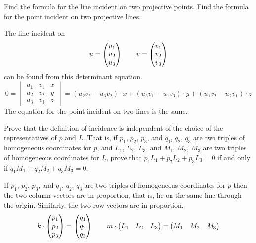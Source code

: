 \begin{exercises}
  \item
    Find the formula for the line incident on two projective points.
    Find the formula for the point incident on two projective lines.
    \begin{answer}
      The line incident on 
      \begin{equation*}
        u=\begin{pmatrix} u_1 \\ u_2 \\ u_3 \end{pmatrix}
        \qquad
        v=\begin{pmatrix} v_1 \\ v_2 \\ v_3 \end{pmatrix}
      \end{equation*}
      can be found from this determinant equation.
      \begin{equation*}
        0=\begin{vmatrix}
          u_1  &v_1  &x  \\
          u_2  &v_2  &y  \\
          u_3  &v_3  &z
        \end{vmatrix}
        =(u_2v_3-u_3v_2)\cdot x 
          + (u_3v_1-u_1v_3)\cdot y 
          + (u_1v_2-u_2v_1)\cdot z
      \end{equation*}
      The equation for the point incident on two lines is the same. 
    \end{answer}
  \item \label{exer:IncidentIndReps}
    Prove that the definition of incidence is independent of the choice of 
    the representatives of $p$ and $L$.
    That is, if $p_1$, $p_2$, $p_3$, and $q_1$, $q_2$, $q_3$ are two triples of
    homogeneous coordinates for $p$, and 
    $L_1$, $L_2$, $L_3$, and $M_1$, $M_2$, $M_3$ are two triples of 
    homogeneous coordinates for $L$, prove that  
    $p_1L_1+p_2L_2+p_3L_3=0$ if and only if 
    $q_1M_1+q_2M_2+q_3M_3=0$. 
    \begin{answer}
      If $p_1$, $p_2$, $p_3$, and $q_1$, $q_2$, $q_3$ are two triples of
      homogeneous coordinates for $p$ then the two column vectors
      are in proportion, that is, lie on the same line through the
      origin.
      Similarly, the two row vectors are in proportion.
      \begin{equation*}
        k\cdot\begin{pmatrix} p_1 \\ p_2 \\ p_3 \end{pmatrix}
          =\begin{pmatrix} q_1 \\ q_2 \\ q_3 \end{pmatrix}
        \qquad
        m\cdot\begin{pmatrix} L_1 &L_2 &L_3 \end{pmatrix}
          =\begin{pmatrix} M_1 &M_2 &M_3 \end{pmatrix}
      \end{equation*}

\end{answer}
\end{exercises}
